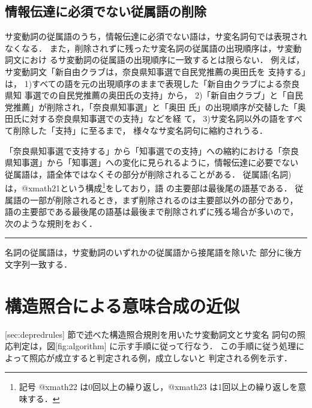 \subsection{情報伝達に必須でない従属語の削除}

サ変動詞の従属語のうち，情報伝達に必須でない語は，サ変名詞句では表現され
なくなる．
また，削除されずに残ったサ変名詞の従属語の出現順序は，サ変動詞文におけ
るサ変動詞の従属語の出現順序に一致するとは限らない．
例えば，サ変動詞文「新自由クラブは，奈良県知事選で自民党推薦の奥田氏を
支持する」は，
1)すべての語を元の出現順序のままで表現した「新自由クラブによる奈良県知
事選での自民党推薦の奥田氏の支持」から，
2)「新自由クラブ」と「自民党推薦」が削除され，「奈良県知事選」と「奥田
氏」の出現順序が交替した「奥田氏に対する奈良県知事選での支持」などを経
て，
3)サ変名詞以外の語をすべて削除した「支持」に至るまで，
様々なサ変名詞句に縮約されうる．

「奈良県知事選で支持する」から「知事選での支持」への縮約における「奈良
県知事選」から「知事選」への変化に見られるように，情報伝達に必要でない
従属語は，語全体ではなくその部分が削除されることがある．
従属語(名詞)は，@xmath21という構成\footnote{記号 @xmath22
は0回以上の繰り返し，@xmath23 は1回以上の繰り返しを意味する．}をしており，語
の主要部は最後尾の語基である．
従属語の一部が削除されるとき，まず削除されるのは主要部以外の部分であり，
語の主要部である最後尾の語基は最後まで削除されずに残る場合が多いので，
次のような規則をおく．
\begin{RULE}
\rule サ変名詞の従属語は，サ変動詞のいずれかの従属語から接尾語を除いた
部分に後方文字列一致する．
\label{RULE:stringmatch} 
\end{RULE}


\section{構造照合による意味合成の近似}
\label{sec:matching}

[sec:depredrules] 節で述べた構造照合規則を用いたサ変動詞文とサ変名
詞句の照応判定は，図[fig:algorithm] に示す手順に従って行なう．
この手順に従う処理によって照応が成立すると判定される例，成立しないと
判定される例を示す．


